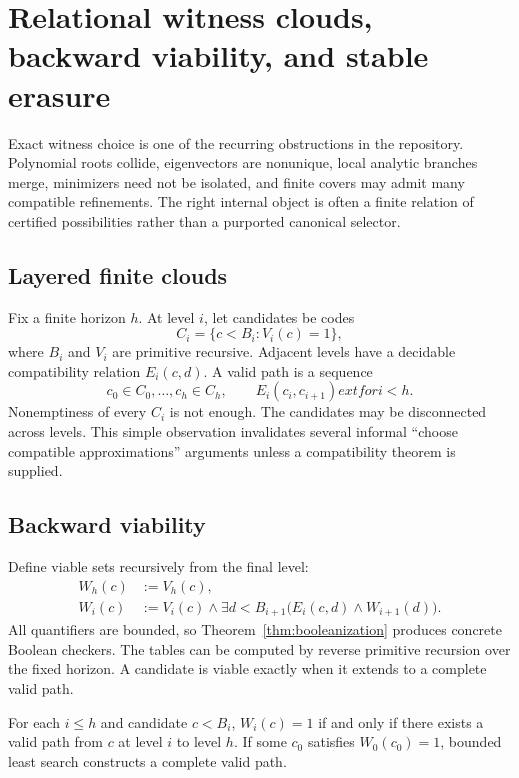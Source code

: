 \section{Relational witness clouds, backward viability, and stable erasure}
\label{sec:clouds}

Exact witness choice is one of the recurring obstructions in the repository.  Polynomial roots collide,
eigenvectors are nonunique, local analytic branches merge, minimizers need not be isolated, and finite
covers may admit many compatible refinements.  The right internal object is often a finite relation of
certified possibilities rather than a purported canonical selector.

\subsection{Layered finite clouds}

Fix a finite horizon \(h\).  At level \(i\), let candidates be codes
\[
 C_i=\{c<B_i : V_i(c)=1\},
\]
where \(B_i\) and \(V_i\) are primitive recursive.  Adjacent levels have a decidable compatibility relation
\(E_i(c,d)\).  A valid path is a sequence
\[
 c_0\in C_0,\ldots,c_h\in C_h,
 \qquad E_i(c_i,c_{i+1})	ext{ for }i<h.
\]
Nonemptiness of every \(C_i\) is not enough.  The candidates may be disconnected across levels.  This
simple observation invalidates several informal ``choose compatible approximations'' arguments unless a
compatibility theorem is supplied.

\subsection{Backward viability}

Define viable sets recursively from the final level:
\begin{align*}
 W_h(c) &:= V_h(c),\\
 W_i(c) &:= V_i(c)\wedge
    \exists d<B_{i+1}\bigl(E_i(c,d)\wedge W_{i+1}(d)\bigr).
\end{align*}
All quantifiers are bounded, so Theorem~\ref{thm:booleanization} produces concrete Boolean checkers.  The
tables can be computed by reverse primitive recursion over the fixed horizon.  A candidate is viable exactly
when it extends to a complete valid path.

\begin{theorem}
\label{thm:viability}
For each \(i\le h\) and candidate \(c<B_i\), \(W_i(c)=1\) if and only if there exists a valid path from
\(c\) at level \(i\) to level \(h\).  If some \(c_0\) satisfies \(W_0(c_0)=1\), bounded least search
constructs a complete valid path.
\end{theorem}

